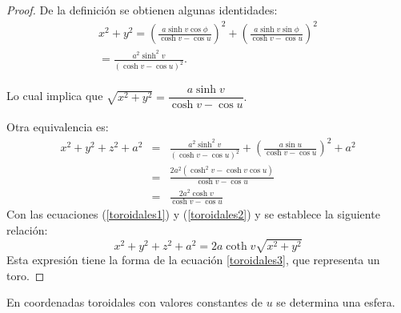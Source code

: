 \begin{proof}
De la definición se obtienen algunas identidades:
{\small
\begin{multline}
x^2+y^2 = \left( \frac{a\sinh v\cos \phi }{\cosh v-\cos u}\right)^2+\left( \frac{a\sinh v\sin \phi }{\cosh v-\cos u}\right) ^2\\
=  \frac{a^2 \sinh ^2v}{\left(\cosh v-\cos u\right) ^2}. \label{toroidales1}
\end{multline}
}

Lo cual implica que {\small $\sqrt{x^2+y^2}=\dfrac{a\sinh v}{\cosh v-\cos u}$.
}

Otra equivalencia es:
\begin{eqnarray}
x^2+y^2+z^2+a^2 &=&  \frac{a^2 \sinh ^2v}{\left(\cosh v-\cos u\right) ^2} +\left( \frac{a\sin u}{\cosh v-\cos u}\right) ^2+a^2 \nonumber \\
&=& \frac{2a^2 (\cosh ^{2}v-\cosh v\cos u)}{\cosh v-\cos u} \\ &=& \frac{2a^2 \cosh v}{\cosh v-\cos u} \label{toroidales2}
\end{eqnarray}
Con las ecuaciones (\ref{toroidales1}) y (\ref{toroidales2}) y se establece la siguiente relación:
\begin{equation}
x^2+y^2+z^2+a^2=2a\coth v\sqrt{x^2+y^2}
\end{equation}
Esta expresión tiene la forma de la ecuación \ref{toroidales3},
que representa un toro.
\end{proof}

\begin{prop}
En coordenadas toroidales con valores constantes de $u$ se determina una esfera.
\end{prop}

